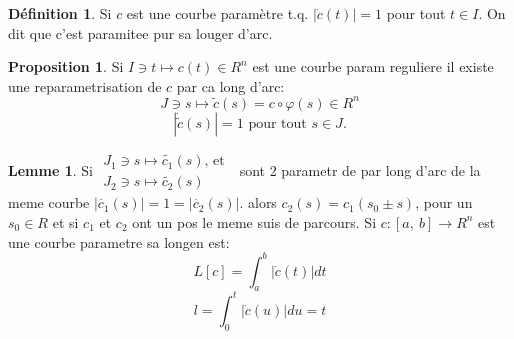 \documentclass[french]{article}
\theoremstyle{definition}
\newtheorem{definition}{Définition}[section]
\theoremstyle{theorem}
\theoremstyle{proposition}
\newtheorem{proposition}{Proposition}[section]
\theoremstyle{lemme}
\newtheorem{lemme}{Lemme}[section]
\begin{document}
\begin{definition}
Si $c$ est une courbe paramètre t.q. $|\dot{c}(t)|=1$ pour tout $t\in I$. On dit que c'est paramitee pur sa louger d'arc.
\end{definition}

\begin{proposition}
Si $I\ni t\mapsto c(t)\in R^n$ est une courbe param reguliere il existe une reparametrisation de $c$ par ca long d'arc:
$$J\ni s\mapsto \tilde{c}(s)=c\circ\varphi(s)\in R^n$$
$$|\dot{\tilde{c}}(s)|=1 \mbox{ pour tout } s\in J.$$
\end{proposition}

\begin{lemme}
Si $
\begin{array}{rl} 
J_1\ni s \mapsto \tilde{c_1}(s)\mbox{, et }\\ 
J_2\ni s \mapsto \tilde{c_2}(s)
\end{array} $
sont 2 parametr de par long d'arc de la meme courbe $|\dot{c_1}(s)| = 1 = |\dot{c_2}(s)|$.
alors $c_2(s)=c_1(s_0\pm s)$, pour un $s_0\in R$ et si $c_1$ et $c_2$ ont un pos le meme suis de parcours. Si $c:[a,\ b]\rightarrow R^n$ est une courbe parametre sa longen est:
$$ L[c] = \int_{a}^{b} |\dot{c}(t)| dt$$
$$l =\int_{0}^{t} |\dot{c}(u)| du = t$$ %
\end{lemme}
\end{document}
